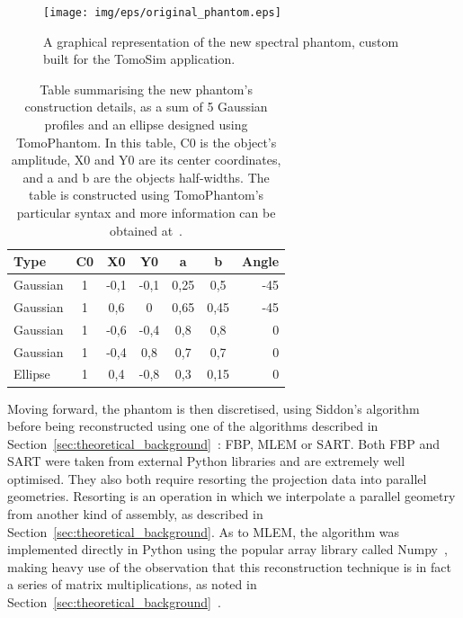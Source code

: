 \begin{figure}[htpb]
    \centering
    \texttt{[image: img/eps/original\_phantom.eps]}
    \caption{A graphical representation of the new spectral phantom,
    custom built for the TomoSim application.}
    \label{fig:new_phantom}
\end{figure}


\begin{table}[htpb]
    \centering
    \caption{Table summarising the new phantom's construction details,
    as a sum of 5 Gaussian profiles and an ellipse designed using
    TomoPhantom. In this table, C0 is the object's amplitude, X0 and Y0
    are its center coordinates, and a and b are the objects half-widths.
    The table is constructed using TomoPhantom's particular syntax and
    more information can be obtained at~\cite{Kazantsev2018}.}
    \label{tab:new_phantom}
    \begin{tabular}{@{}lcccccr@{}}
    \hline
    \textbf{Type} & \textbf{C0} & \textbf{X0} & \textbf{Y0} & \textbf{a}
                  & \textbf{b} & \textbf{\textbf{Angle}} \\ \hline
    Gaussian & 1 & -0,1 & -0,1 & 0,25 & 0,5 & -45 \\
    Gaussian & 1 & 0,6 & 0 & 0,65 & 0,45 & -45 \\
    Gaussian & 1 & -0,6 & -0,4 & 0,8 & 0,8 & 0 \\
    Gaussian & 1 & -0,4 & 0,8 & 0,7 & 0,7 & 0 \\
    Ellipse & 1 & 0,4 & -0,8 & 0,3 & 0,15 & 0 \\ \hline
    \end{tabular}
\end{table}

Moving forward, the phantom is then discretised, using Siddon's
algorithm~ before being reconstructed using one of
the algorithms described in
Section~\ref{sec:theoretical_background}~:
\gls{FBP}, \gls{MLEM} or \gls{SART}. Both \gls{FBP} and \gls{SART} were
taken from external Python libraries and are extremely well optimised.
They also both require resorting the projection data into parallel
geometries. Resorting is an operation in which we interpolate a parallel
geometry from another kind of assembly, as described in
Section~\ref{sec:theoretical_background}. As to \gls{MLEM}, the
algorithm was implemented directly in Python using the popular array
library called Numpy~\cite{Oliphant2007}, making heavy use of the
observation that this reconstruction technique is in fact a series of
matrix multiplications, as noted in
Section~\ref{sec:theoretical_background}~. 

